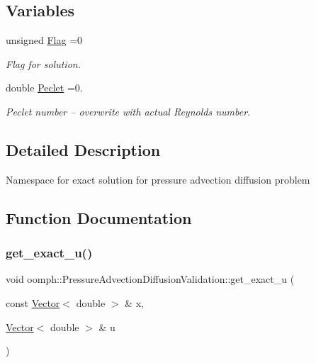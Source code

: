 \subsection*{Variables}
\begin{DoxyCompactItemize}
\item 
unsigned \hyperlink{namespaceoomph_1_1PressureAdvectionDiffusionValidation_aa0684ebcce5057df03bfcdecdc3e70f3}{Flag} =0
\begin{DoxyCompactList}\small\item\em Flag for solution. \end{DoxyCompactList}\item 
double \hyperlink{namespaceoomph_1_1PressureAdvectionDiffusionValidation_aec6b0be7e95a7eba69e8aefe0921a5e5}{Peclet} =0.
\begin{DoxyCompactList}\small\item\em Peclet number -- overwrite with actual Reynolds number. \end{DoxyCompactList}\end{DoxyCompactItemize}


\subsection{Detailed Description}
Namespace for exact solution for pressure advection diffusion problem 

\subsection{Function Documentation}
\mbox{\label{namespaceoomph_1_1PressureAdvectionDiffusionValidation_a4f01cf3a330e714439119ccd6e79f11e}} 
\subsubsection{\texorpdfstring{get\+\_\+exact\+\_\+u()}{get\_exact\_u()}\hspace{0.1cm}{\footnotesize\ttfamily [1/2]}}
{\footnotesize\ttfamily void oomph\+::\+Pressure\+Advection\+Diffusion\+Validation\+::get\+\_\+exact\+\_\+u (\begin{DoxyParamCaption}\item[{const \hyperlink{classoomph_1_1Vector}{Vector}$<$ double $>$ \&}]{x,  }\item[{\hyperlink{classoomph_1_1Vector}{Vector}$<$ double $>$ \&}]{u }\end{DoxyParamCaption})}



